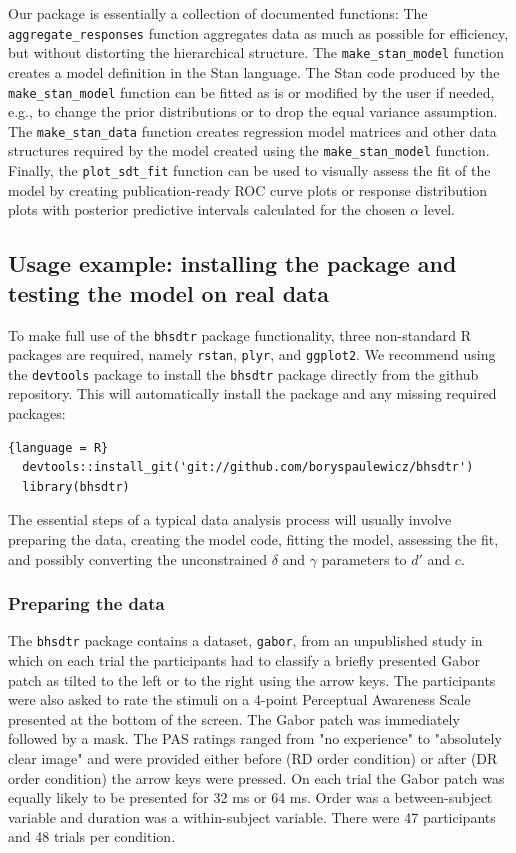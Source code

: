 \documentclass[a4paper,man,apacite,floatsintext]{apa6}
\newcommand{\code}[1]{\texttt{#1}}
\begin{document}
Our package is essentially a collection of documented functions: The
\code{aggregate\_responses} function aggregates data as much as
possible for efficiency, but without distorting the hierarchical
structure. The \code{make\_stan\_model} function creates a model
definition in the Stan language. The Stan code produced by the
\code{make\_stan\_model} function can be fitted as is or modified by
the user if needed, e.g., to change the prior distributions or to drop
the equal variance assumption. The \code{make\_stan\_data} function
creates regression model matrices and other data structures required
by the model created using the \code{make\_stan\_model}
function. Finally, the \code{plot\_sdt\_fit} function can be used to
visually assess the fit of the model by creating publication-ready ROC
curve plots or response distribution plots with posterior predictive
intervals calculated for the chosen $\alpha$ level.

\subsection{Usage example: installing the package and testing the
  model on real data}

To make full use of the \code{bhsdtr} package functionality, three
non-standard R packages are required, namely \code{rstan},
\code{plyr}, and \code{ggplot2}. We recommend using the
\code{devtools} package to install the \code{bhsdtr} package directly
from the github repository. This will automatically install the
package and any missing required packages:

\begin{lstlisting}{language = R}
  devtools::install_git('git://github.com/boryspaulewicz/bhsdtr')
  library(bhsdtr)
\end{lstlisting}

The essential steps of a typical data analysis process will usually
involve preparing the data, creating the model code, fitting the
model, assessing the fit, and possibly converting the unconstrained
$\delta$ and $\gamma$ parameters to $d'$ and $c$.

\subsubsection{Preparing the data}

The \code{bhsdtr} package contains a dataset, \code{gabor}, from an
unpublished study in which on each trial the participants had to
classify a briefly presented Gabor patch as tilted to the left or to
the right using the arrow keys. The participants were also asked to
rate the stimuli on a 4-point Perceptual Awareness Scale
\cite{ramsoy2004introspection} presented at the bottom of the
screen. The Gabor patch was immediately followed by a mask. The PAS
ratings ranged from "no experience" to "absolutely clear image" and
were provided either before (RD order condition) or after (DR order
condition) the arrow keys were pressed. On each trial the Gabor patch
was equally likely to be presented for 32 ms or 64 ms. Order was a
between-subject variable and duration was a within-subject
variable. There were 47 participants and 48 trials per condition.
\end{document}
